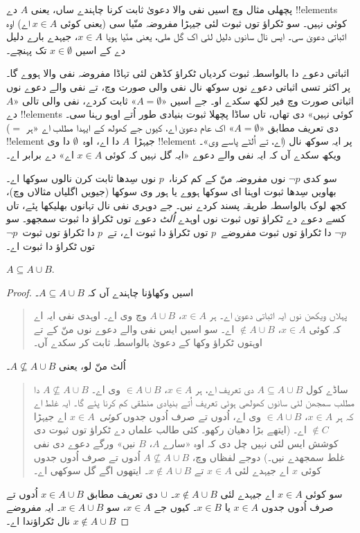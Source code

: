 \documentclass[../../../include/open-logic-section]{subfiles}
\begin{document}
پچھلی مثال وچ اسیں نفی والا دعویٰ ثابت کرنا چاہندے ساں، یعنی $A$ دے !!{element}s کوئی نہیں۔ سو ٹکراؤ توں ثبوت لئی جیہڑا مفروضہ منّیا سی (یعنی کوئی $x \in A$ اے) اوہ اثباتی دعویٰ سی۔ ایس نال سانوں دلیل لئی اک گل ملی، یعنی منّیا ہویا $x \in A$، جیہدے بارے دلیل دے کے اسیں $x \in \emptyset$ تک پہنچے۔

اثباتی دعوے دا بالواسطہ ثبوت کردیاں ٹکراؤ کڈھن لئی تہاڈا مفروضہ نفی والا ہووے گا۔ پر اکثر تسی اثباتی دعوے نوں سوکھ نال نفی والی صورت وچ، تے نفی والے دعوے نوں اثباتی صورت وچ فیر لکھ سکدے او۔ جے اسیں «$A = \emptyset$» ثابت کردے، نفی والی تالی «$A$ دے !!{element}s کوئی نہیں» دی تھاں، تاں ساڈا پچھلا ثبوت بنیادی طور اُتے اوہو رہنا سی۔ ($=$ دی تعریف مطابق «$A = \emptyset$» اک عام دعویٰ اے، کیوں جے کھولھ کے ایہدا مطلب اے «ہر !!{element} جیہڑا~$A$ دا اے، اوہ~$\emptyset$ دا وی !!{element} اے، تے اُلٹے پاسے وی»۔) پر ایہ سوکھ نال ویکھ سکدے آں کہ ایہ نفی والے دعوے «ایہ گل نہیں کہ کوئی $x \in A$ اے» دے برابر اے۔

سو کدی $\lnot p$ نوں مفروضہ منّ کے کم کرنا،~$p$ نوں سِدھا ثابت کرن نالوں سوکھا اے۔ بھاویں سِدھا ثبوت اوہنا ای سوکھا ہووے یا ہور وی سوکھا (جیویں اگلیاں مثالاں وچ)، کجھ لوک بالواسطہ طریقہ پسند کردے نیں۔ جے دوہری نفی نال تہانوں بھلیکھا پئے، تاں کسے دعوے دے ٹکراؤ توں ثبوت نوں اوہدے \emph{اُلٹ} دعوے توں ٹکراؤ دا ثبوت سمجھو۔ سو $\lnot
p$ دا ٹکراؤ توں ثبوت مفروضے~$p$ توں ٹکراؤ دا ثبوت اے، تے~$p$ دا ٹکراؤ توں ثبوت~$\lnot p$ توں ٹکراؤ دا ثبوت اے۔

\begin{prop}
$A \subseteq A \cup B$.
\end{prop}

\begin{proof}
  اسیں وکھاؤنا چاہندے آں کہ $A \subseteq A \cup B$۔
  \begin{quote}
    پہلاں ویکھن نوں ایہ اثباتی دعویٰ اے۔ ہر $x \in A$، $A \cup B$ وچ وی اے۔ اوہدی نفی ایہ اے کہ کوئی $x \in A$، $\notin A \cup B$ اے۔ سو اسیں ایس نفی والے دعوے نوں منّ کے تے اوہتوں ٹکراؤ وکھا کے دعویٰ بالواسطہ ثابت کر سکدے آں۔
    \end{quote}
  اُلٹ منّ لو، یعنی $A \nsubseteq A \cup B$۔
  \begin{quote}
    ساڈے کول $A \subseteq A \cup B$ دی تعریف اے، ہر $x \in A$، $\in A \cup B$ وی اے۔ $A \nsubseteq A \cup B$ دا مطلب سمجھن لئی سانوں کھولھی ہوئی تعریف اُتے بنیادی منطقی کم کرنا پئے گا۔ ایہ غلط اے کہ ہر $x \in A$، $\in
    A \cup B$ وی اے، اُدوں تے صرف اُدوں جدوں \emph{کوئی}~$x \in A$ اے جیہڑا $\notin C$ اے۔ (ایتھے بڑا دھیان رکھو۔ کئی طالب علماں دے ٹکراؤ توں ثبوت دی کوشش ایس لئی نہیں چل دی کہ اوہ «سارے $A$، $B$ نیں» ورگے دعوے دی نفی غلط سمجھدے نیں۔) دوجے لفظاں وچ، $A \nsubseteq A \cup B$ اُدوں تے صرف اُدوں جدوں کوئی $x$ اے جیہدے لئی $x \in A$ تے $x \notin A \cup B$۔ ایتھوں اگے گل سوکھی اے۔
  \end{quote}
  سو کوئی $x \in A$ اے جیہدے لئی $x \notin A \cup B$۔ $\cup$ دی تعریف مطابق $x \in A \cup B$ اُدوں تے صرف اُدوں جدوں $x \in A$ یا $x \in
  B$۔ کیوں جے $x \in A$، سو $x \in A \cup B$۔ ایہ مفروضے $x \notin A \cup B$ نال ٹکراؤندا اے۔
\end{proof}
\end{document}
